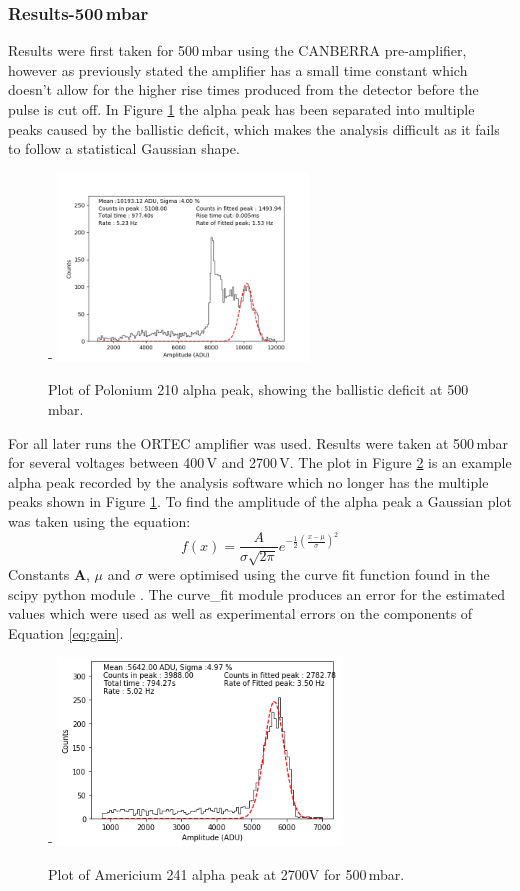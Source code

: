 \documentclass[a4paper]{article}
\begin{document}
\subsubsection{Results-500\,mbar}
Results were first taken for 500\,mbar using the CANBERRA pre-amplifier, however as previously stated the amplifier has a small time constant which doesn't allow for the higher rise times produced from the detector before the pulse is cut off. In Figure \ref{fig:uj} the alpha peak has been separated into multiple peaks caused by the ballistic deficit, which makes the analysis difficult as it fails to follow a statistical Gaussian shape.
\begin{figure}[H]-
    \centering
    \includegraphics[height=5cm]{plots/uj27n001_amp.png}
    \caption{Plot of Polonium 210 alpha peak, showing the ballistic deficit at 500\,mbar.}
    \label{fig:uj}
\end{figure}
\noindent For all later runs the ORTEC amplifier was used. Results were taken at 500\,mbar for several voltages between 400\,V and 2700\,V. The plot in Figure \ref{fig:uk} is an example alpha peak recorded by the analysis software which no longer has the multiple peaks shown in Figure \ref{fig:uj}. To find the amplitude of the alpha peak a Gaussian plot was taken using the equation:
\begin{equation}
    f(x) = \frac{A}{\sigma\sqrt{2\pi}}e^{-\frac{1}{2}(\frac{x-\mu}{\sigma})^2}
    \label{eq:guas}
\end{equation}
Constants \textbf{A}, \textbf{$\mu$} and \textbf{$\sigma$} were optimised using the curve fit function found in the scipy python module \cite{scipy}. The curve\_fit module produces an error for the estimated values which were used as well as experimental errors on the components of Equation \ref{eq:gain}. 
\begin{figure}[H]-
    \centering
    \includegraphics[height=5cm]{plots/uk09n002_amp.png}
    \caption{Plot of Americium 241 alpha peak at 2700V for 500\,mbar.}
    \label{fig:uk}
\end{figure}
\end{document}
